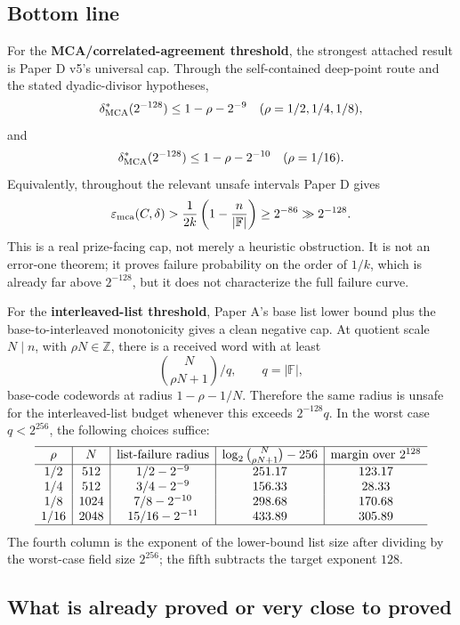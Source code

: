 \documentclass[11pt]{article}
\newcommand{\F}{\mathbb F}
\newcommand{\epsmca}{\varepsilon_{\rm mca}}
\begin{document}
\subsection{Bottom line}

For the \textbf{MCA/correlated-agreement threshold}, the strongest attached
result is Paper D v5's universal cap.  Through the self-contained deep-point
route and the stated dyadic-divisor hypotheses,
\[
  \delta^*_{\rm MCA}(2^{-128})
  \le 1-\rho-2^{-9}
  \quad (\rho=1/2,1/4,1/8),
\]
and
\[
  \delta^*_{\rm MCA}(2^{-128})
  \le 1-\rho-2^{-10}
  \quad (\rho=1/16).
\]
Equivalently, throughout the relevant unsafe intervals Paper D gives
\[
  \epsmca(C,\delta)
  >\frac1{2k}\left(1-\frac n{|\F|}\right)
  \ge2^{-86}\gg2^{-128}.
\]
This is a real prize-facing cap, not merely a heuristic obstruction.  It is not
an error-one theorem; it proves failure probability on the order of \(1/k\),
which is already far above \(2^{-128}\), but it does not characterize the full
failure curve.

For the \textbf{interleaved-list threshold}, Paper A's base list lower bound
plus the base-to-interleaved monotonicity gives a clean negative cap.  At quotient
scale \(N\mid n\), with \(\rho N\in\mathbb Z\), there is a received word with at
least
\[
  \binom{N}{\rho N+1}/q,
  \qquad q=|\F|,
\]
base-code codewords at radius \(1-\rho-1/N\).  Therefore the same radius is
unsafe for the interleaved-list budget whenever this exceeds \(2^{-128}q\).  In
the worst case \(q<2^{256}\), the following choices suffice:
\[
\begin{array}{c|c|c|c|c}
\hline
\rho & N & \text{list-failure radius} &
\log_2\binom{N}{\rho N+1}-256 &
\text{margin over }2^{128}\\
\hline
1/2  & 512  & 1/2-2^{-9}    & 251.17 & 123.17\\
1/4  & 512  & 3/4-2^{-9}    & 156.33 & 28.33\\
1/8  & 1024 & 7/8-2^{-10}   & 298.68 & 170.68\\
1/16 & 2048 & 15/16-2^{-11} & 433.89 & 305.89\\
\hline
\end{array}
\]
The fourth column is the exponent of the lower-bound list size after dividing by
the worst-case field size \(2^{256}\); the fifth subtracts the target exponent
\(128\).

\subsection{What is already proved or very close to proved}
\end{document}
